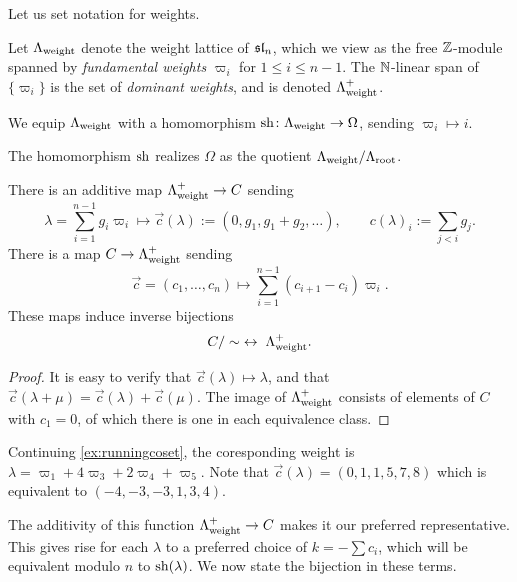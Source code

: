 Let us set notation for weights.

\begin{defn} Let $\Lambda_{\operatorname{weight}}$ denote the weight lattice of $\mathfrak{sl}_n$, which we view as the free $\mathbb{Z}$-module spanned by \emph{fundamental weights} $\varpi_i$ for $1 \le i \le n-1$.  The $\mathbb{N}$-linear span of $\{\varpi_i\}$ is the set of \emph{dominant weights}, and is denoted $\Lambda^+_{\operatorname{weight}}$.

We equip $\Lambda_{\operatorname{weight}}$ with a homomorphism $\operatorname{sh} \colon \Lambda_{\operatorname{weight}} \to \Omega$, sending $\varpi_i \mapsto i$.
\end{defn}

\begin{remark} The homomorphism $\operatorname{sh}$ realizes $\Omega$ as the quotient $\Lambda_{\operatorname{weight}}/\Lambda_{\operatorname{root}}$. \end{remark}

\begin{lemma} \label{lem:cadditive} There is an additive map $\Lambda^+_{\operatorname{weight}} \to C$ sending
\begin{equation} \lambda = \sum_{i=1}^{n-1} g_i \varpi_i \mapsto \vec{c}(\lambda) := (0, g_1, g_1+g_2, \ldots), \qquad c(\lambda)_i := \sum_{j<i} g_j. \end{equation}
There is a map $C \to \Lambda^+_{\operatorname{weight}}$ sending
\begin{equation} \vec{c} = (c_1, \ldots, c_n) \mapsto \sum_{i=1}^{n-1} (c_{i+1} - c_i) \varpi_i. \end{equation}
These maps induce inverse bijections
\[ C/\sim \; \leftrightarrow \; \Lambda^+_{\operatorname{weight}}. \] \end{lemma}

\begin{proof} It is easy to verify that $\vec{c}(\lambda) \mapsto \lambda$, and that $\vec{c}(\lambda + \mu) = \vec{c}(\lambda) + \vec{c}(\mu)$. The image of $\Lambda^+_{\operatorname{weight}}$ consists of elements of $C$ with $c_1 = 0$, of which there is one in each equivalence class. \end{proof}

\begin{example} Continuing \cref{ex:runningcoset}, the coresponding weight is $\lambda = \varpi_1 + 4 \varpi_3 + 2 \varpi_4 + \varpi_5$. Note that $\vec{c}(\lambda) = (0,1,1,5,7,8)$ which is equivalent to $(-4,-3,-3,1,3,4)$. 
\end{example}

The additivity of this function $\Lambda^+_{\operatorname{weight}} \to C$ makes it our preferred representative. This gives rise for each $\lambda$ to a preferred choice of $k = -\sum c_i$, which will be equivalent modulo $n$ to $\operatorname{sh}(\lambda)$. We now state the bijection in these terms.


